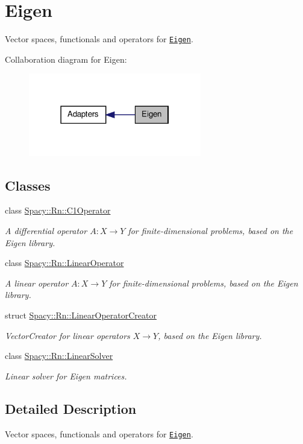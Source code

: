 \hypertarget{group__EigenGroup}{\section{\-Eigen}
\label{group__EigenGroup}
}


\-Vector spaces, functionals and operators for \href{http://eigen.tuxfamily.org}{\tt \-Eigen}.  


\-Collaboration diagram for \-Eigen\-:
\nopagebreak
\begin{figure}[H]
\begin{center}
\leavevmode
\includegraphics[width=214pt]{group__EigenGroup}
\end{center}
\end{figure}
\subsection*{\-Classes}
\begin{DoxyCompactItemize}
\item 
class \hyperlink{classSpacy_1_1Rn_1_1C1Operator}{\-Spacy\-::\-Rn\-::\-C1\-Operator}
\begin{DoxyCompactList}\small\item\em \-A differential operator $A:X\rightarrow Y$ for finite-\/dimensional problems, based on the \-Eigen library. \end{DoxyCompactList}\item 
class \hyperlink{classSpacy_1_1Rn_1_1LinearOperator}{\-Spacy\-::\-Rn\-::\-Linear\-Operator}
\begin{DoxyCompactList}\small\item\em \-A linear operator $A:X\rightarrow Y$ for finite-\/dimensional problems, based on the \-Eigen library. \end{DoxyCompactList}\item 
struct \hyperlink{structSpacy_1_1Rn_1_1LinearOperatorCreator}{\-Spacy\-::\-Rn\-::\-Linear\-Operator\-Creator}
\begin{DoxyCompactList}\small\item\em \-Vector\-Creator for linear operators $X\rightarrow Y$, based on the \-Eigen library. \end{DoxyCompactList}\item 
class \hyperlink{classSpacy_1_1Rn_1_1LinearSolver}{\-Spacy\-::\-Rn\-::\-Linear\-Solver}
\begin{DoxyCompactList}\small\item\em \-Linear solver for \-Eigen matrices. \end{DoxyCompactList}\end{DoxyCompactItemize}


\subsection{\-Detailed \-Description}
\-Vector spaces, functionals and operators for \href{http://eigen.tuxfamily.org}{\tt \-Eigen}. 